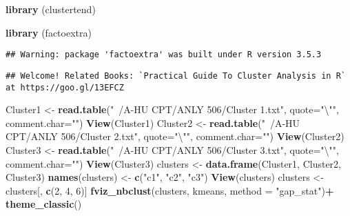 \documentclass[]{article}
\newenvironment{Shaded}{\begin{snugshade}}{\end{snugshade}}
\newcommand{\KeywordTok}[1]{\textcolor[rgb]{0.13,0.29,0.53}{\textbf{#1}}}
\newcommand{\DataTypeTok}[1]{\textcolor[rgb]{0.13,0.29,0.53}{#1}}
\newcommand{\DecValTok}[1]{\textcolor[rgb]{0.00,0.00,0.81}{#1}}
\newcommand{\CharTok}[1]{\textcolor[rgb]{0.31,0.60,0.02}{#1}}
\newcommand{\StringTok}[1]{\textcolor[rgb]{0.31,0.60,0.02}{#1}}
\newcommand{\OperatorTok}[1]{\textcolor[rgb]{0.81,0.36,0.00}{\textbf{#1}}}
\newcommand{\NormalTok}[1]{#1}
\begin{document}
\begin{Shaded}
\begin{Highlighting}[]
\KeywordTok{library}\NormalTok{ (clustertend)}
          
\KeywordTok{library}\NormalTok{ (factoextra)}
\end{Highlighting}
\end{Shaded}

\begin{verbatim}
## Warning: package 'factoextra' was built under R version 3.5.3
\end{verbatim}

\begin{verbatim}
## Welcome! Related Books: `Practical Guide To Cluster Analysis in R` at https://goo.gl/13EFCZ
\end{verbatim}

\begin{Shaded}
\begin{Highlighting}[]
\NormalTok{Cluster1 <-}\StringTok{ }\KeywordTok{read.table}\NormalTok{(}\StringTok{"~/A-HU CPT/ANLY 506/Cluster 1.txt"}\NormalTok{, }\DataTypeTok{quote=}\StringTok{"}\CharTok{\textbackslash{}"}\StringTok{"}\NormalTok{, }\DataTypeTok{comment.char=}\StringTok{""}\NormalTok{)}
\KeywordTok{View}\NormalTok{(Cluster1)}
\NormalTok{Cluster2 <-}\StringTok{ }\KeywordTok{read.table}\NormalTok{(}\StringTok{"~/A-HU CPT/ANLY 506/Cluster 2.txt"}\NormalTok{, }\DataTypeTok{quote=}\StringTok{"}\CharTok{\textbackslash{}"}\StringTok{"}\NormalTok{, }\DataTypeTok{comment.char=}\StringTok{""}\NormalTok{)}
\KeywordTok{View}\NormalTok{(Cluster2)}
\NormalTok{Cluster3 <-}\StringTok{ }\KeywordTok{read.table}\NormalTok{(}\StringTok{"~/A-HU CPT/ANLY 506/Cluster 3.txt"}\NormalTok{, }\DataTypeTok{quote=}\StringTok{"}\CharTok{\textbackslash{}"}\StringTok{"}\NormalTok{, }\DataTypeTok{comment.char=}\StringTok{""}\NormalTok{)}
\KeywordTok{View}\NormalTok{(Cluster3)}
\NormalTok{clusters <-}\StringTok{ }\KeywordTok{data.frame}\NormalTok{(Cluster1, Cluster2, Cluster3)}
\KeywordTok{names}\NormalTok{(clusters) <-}\StringTok{ }\KeywordTok{c}\NormalTok{(}\StringTok{"c1"}\NormalTok{, }\StringTok{"c2"}\NormalTok{, }\StringTok{"c3"}\NormalTok{)}
\KeywordTok{View}\NormalTok{(clusters)}
\NormalTok{clusters <-}\StringTok{ }\NormalTok{clusters[, }\KeywordTok{c}\NormalTok{(}\DecValTok{2}\NormalTok{, }\DecValTok{4}\NormalTok{, }\DecValTok{6}\NormalTok{)]}
\KeywordTok{fviz_nbclust}\NormalTok{(clusters, kmeans, }\DataTypeTok{method =} \StringTok{"gap_stat"}\NormalTok{)}\OperatorTok{+}\StringTok{ }\KeywordTok{theme_classic}\NormalTok{()     }
\end{Highlighting}
\end{Shaded}
\end{document}
